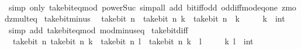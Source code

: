 \begin{isabellebody}
%
\isadelimproof
\ \ %
\endisadelimproof
%
\isatagproof
{}\isamarkupfalse%
\ {\isacharparenleft}{\kern0pt}simp\ only{\isacharcolon}{\kern0pt}\ take{\isacharunderscore}{\kern0pt}bit{\isacharunderscore}{\kern0pt}eq{\isacharunderscore}{\kern0pt}mod\ power{\isacharunderscore}{\kern0pt}Suc{}{\isacharparenright}{\kern0pt}\ {\isacharparenleft}{\kern0pt}simp{\isacharunderscore}{\kern0pt}all\ add{\isacharcolon}{\kern0pt}\ bit{\isacharunderscore}{\kern0pt}iff{\isacharunderscore}{\kern0pt}odd\ odd{\isacharunderscore}{\kern0pt}iff{\isacharunderscore}{\kern0pt}mod{\isacharunderscore}{\kern0pt}{}{\isacharunderscore}{\kern0pt}eq{\isacharunderscore}{\kern0pt}one\ zmod{\isacharunderscore}{\kern0pt}zmult{}{\isacharunderscore}{\kern0pt}eq{\isacharparenright}{\kern0pt}%
\endisatagproof
{\isafoldproof}%
%
\isadelimproof
\isanewline
%
\endisadelimproof
\isanewline
{}\isamarkupfalse%
\ take{\isacharunderscore}{\kern0pt}bit{\isacharunderscore}{\kern0pt}minus{\isacharcolon}{\kern0pt}\isanewline
\ \ {\isacartoucheopen}take{\isacharunderscore}{\kern0pt}bit\ n\ {\isacharparenleft}{\kern0pt}{\isacharminus}{\kern0pt}\ take{\isacharunderscore}{\kern0pt}bit\ n\ k{\isacharparenright}{\kern0pt}\ {\isacharequal}{\kern0pt}\ take{\isacharunderscore}{\kern0pt}bit\ n\ {\isacharparenleft}{\kern0pt}{\isacharminus}{\kern0pt}\ k{\isacharparenright}{\kern0pt}{\isacartoucheclose}\isanewline
\ \ \ \ \ k\ {\isacharcolon}{\kern0pt}{\isacharcolon}{\kern0pt}\ int\isanewline
%
\isadelimproof
\ \ %
\endisadelimproof
%
\isatagproof
{}\isamarkupfalse%
\ {\isacharparenleft}{\kern0pt}simp\ add{\isacharcolon}{\kern0pt}\ take{\isacharunderscore}{\kern0pt}bit{\isacharunderscore}{\kern0pt}eq{\isacharunderscore}{\kern0pt}mod\ mod{\isacharunderscore}{\kern0pt}minus{\isacharunderscore}{\kern0pt}eq{\isacharparenright}{\kern0pt}%
\endisatagproof
{\isafoldproof}%
%
\isadelimproof
\isanewline
%
\endisadelimproof
\isanewline
{}\isamarkupfalse%
\ take{\isacharunderscore}{\kern0pt}bit{\isacharunderscore}{\kern0pt}diff{\isacharcolon}{\kern0pt}\isanewline
\ \ {\isacartoucheopen}take{\isacharunderscore}{\kern0pt}bit\ n\ {\isacharparenleft}{\kern0pt}take{\isacharunderscore}{\kern0pt}bit\ n\ k\ {\isacharminus}{\kern0pt}\ take{\isacharunderscore}{\kern0pt}bit\ n\ l{\isacharparenright}{\kern0pt}\ {\isacharequal}{\kern0pt}\ take{\isacharunderscore}{\kern0pt}bit\ n\ {\isacharparenleft}{\kern0pt}k\ {\isacharminus}{\kern0pt}\ l{\isacharparenright}{\kern0pt}{\isacartoucheclose}\isanewline
\ \ \ \ \ k\ l\ {\isacharcolon}{\kern0pt}{\isacharcolon}{\kern0pt}\ int\isanewline

\end{isabellebody}
